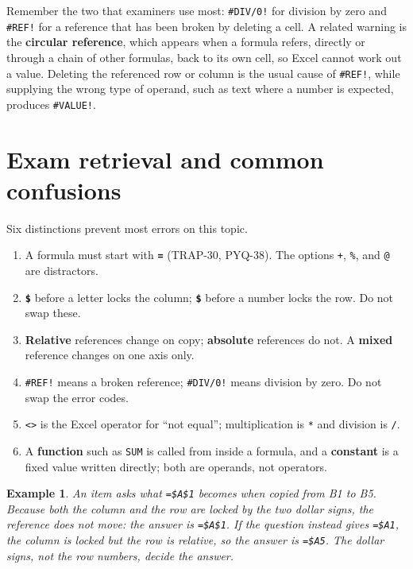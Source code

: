 \documentclass[11pt]{article}
\newtheorem{example}{Example}[section]
\begin{document}
Remember the two that examiners use most: \texttt{\#DIV/0!} for division by
zero and \texttt{\#REF!} for a reference that has been broken by deleting a
cell. A related warning is the \textbf{circular reference}, which appears when
a formula refers, directly or through a chain of other formulas, back to its
own cell, so Excel cannot work out a value. Deleting the referenced row or
column is the usual cause of \texttt{\#REF!}, while supplying the wrong type
of operand, such as text where a number is expected, produces
\texttt{\#VALUE!}.

\section{Exam retrieval and common confusions}
Six distinctions prevent most errors on this topic.
\begin{enumerate}
  \item A formula must start with \textbf{\texttt{=}} (TRAP-30, PYQ-38). The
    options \texttt{+}, \texttt{\%}, and \texttt{@} are distractors.
  \item \textbf{\texttt{\$}} before a letter locks the column; \textbf{\texttt{\$}}
    before a number locks the row. Do not swap these.
  \item \textbf{Relative} references change on copy; \textbf{absolute}
    references do not. A \textbf{mixed} reference changes on one axis only.
  \item \texttt{\#REF!} means a broken reference; \texttt{\#DIV/0!} means
    division by zero. Do not swap the error codes.
  \item \texttt{<>} is the Excel operator for ``not equal''; multiplication is
    \texttt{*} and division is \texttt{/}.
  \item A \textbf{function} such as \texttt{SUM} is called from inside a
    formula, and a \textbf{constant} is a fixed value written directly; both
    are operands, not operators.
\end{enumerate}

\begin{example}
An item asks what \texttt{=\$A\$1} becomes when copied from B1 to B5. Because
both the column and the row are locked by the two dollar signs, the reference
does not move: the answer is \texttt{=\$A\$1}. If the question instead gives
\texttt{=\$A1}, the column is locked but the row is relative, so the answer is
\texttt{=\$A5}. The dollar signs, not the row numbers, decide the answer.
\end{example}
\end{document}
